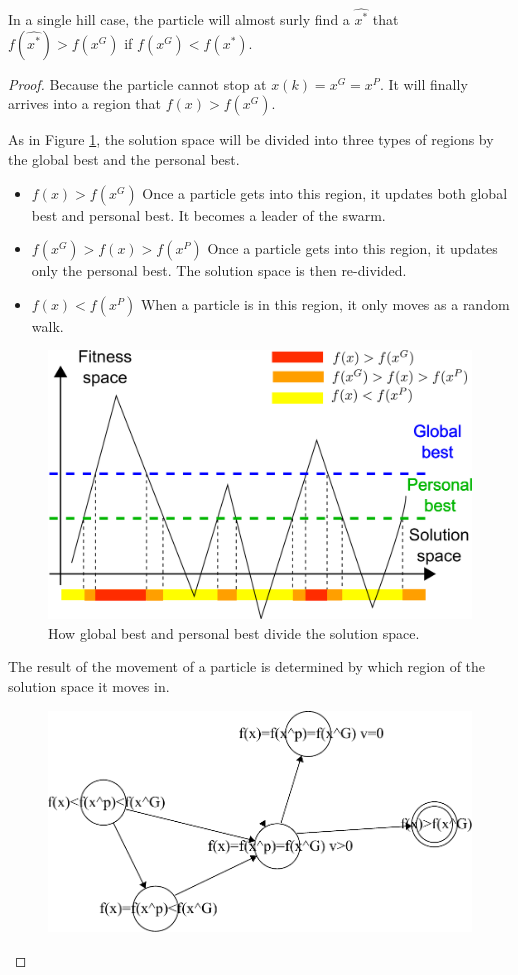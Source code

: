 \begin{mythm}
\label{thm:singleHill:particle:better}
In a single hill case, the particle will almost surly find a $ \hat{x^{*}} $ that $ f(\hat{x^{*}}) > f(x^{G}) $ if $ f( x^{G} ) < f( x^{*}) $.
\begin{proof}
Because the particle cannot stop at $ x(k) = x^{G} = x^{P} $.
It will finally arrives into a region that $ f(x) > f(x^{G}) $.

As in Figure \ref{fig:categorize_regions}, the solution space will be divided into three types of regions by the global best and the personal best.
\begin{itemize}
\item $ f(x) > f(x^G) $
Once a particle gets into this region, it updates both global best and personal best. 
It becomes a leader of the swarm.
\item $ f(x^{G}) > f(x) > f(x^{P}) $
Once a particle gets into this region, it updates only the personal best.
The solution space is then re-divided.
\item $ f(x) < f(x^{P}) $
When a particle is in this region, it only moves as a random walk.
\end{itemize}

\begin{figure}
\centering
\includegraphics[width=0.7\linewidth]{./fig/categorize_regions}
\caption{How global best and personal best divide the solution space.}
\label{fig:categorize_regions}
\end{figure}

The result of the movement of a particle is determined by which region of the solution space it moves in.

\begin{figure}[tbph]
\centering
\includegraphics[width=0.7\linewidth]{./fig/fsm}
\caption{}
\label{fig:fsm}
\end{figure}

\end{proof}
\end{mythm}

